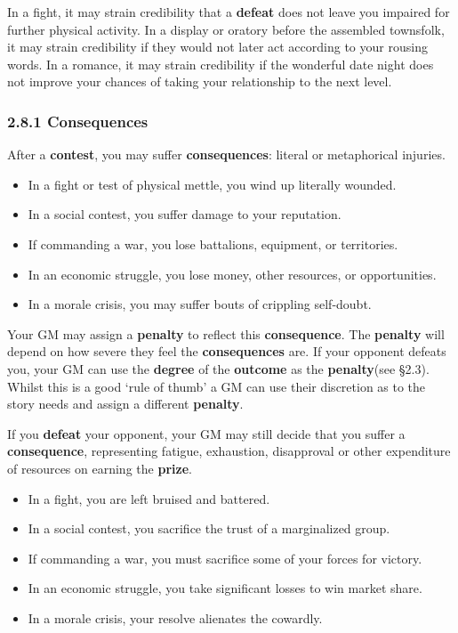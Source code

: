 \documentclass[
  11pt,
]{article}
\providecommand{\tightlist}{%
  \setlength{\itemsep}{0pt}\setlength{\parskip}{0pt}}
\begin{document}
In a fight, it may strain credibility that a \textbf{defeat} does not
leave you impaired for further physical activity. In a display or
oratory before the assembled townsfolk, it may strain credibility if
they would not later act according to your rousing words. In a romance,
it may strain credibility if the wonderful date night does not improve
your chances of taking your relationship to the next level.

\hypertarget{consequences}{%
\subsubsection{2.8.1 Consequences}\label{consequences}}

After a \textbf{contest}, you may suffer \textbf{consequences}: literal
or metaphorical injuries.

\begin{itemize}
\tightlist
\item
  In a fight or test of physical mettle, you wind up literally wounded.
\item
  In a social contest, you suffer damage to your reputation.
\item
  If commanding a war, you lose battalions, equipment, or territories.
\item
  In an economic struggle, you lose money, other resources, or
  opportunities.
\item
  In a morale crisis, you may suffer bouts of crippling self-doubt.
\end{itemize}

Your GM may assign a \textbf{penalty} to reflect this
\textbf{consequence}. The \textbf{penalty} will depend on how severe
they feel the \textbf{consequences} are. If your opponent defeats you,
your GM can use the \textbf{degree} of the \textbf{outcome} as the
\textbf{penalty}(see §2.3). Whilst this is a good `rule of thumb' a GM
can use their discretion as to the story needs and assign a different
\textbf{penalty}.

If you \textbf{defeat} your opponent, your GM may still decide that you
suffer a \textbf{consequence}, representing fatigue, exhaustion,
disapproval or other expenditure of resources on earning the
\textbf{prize}.

\begin{itemize}
\tightlist
\item
  In a fight, you are left bruised and battered.
\item
  In a social contest, you sacrifice the trust of a marginalized group.
\item
  If commanding a war, you must sacrifice some of your forces for
  victory.
\item
  In an economic struggle, you take significant losses to win market
  share.
\item
  In a morale crisis, your resolve alienates the cowardly.
\end{itemize}
\end{document}
